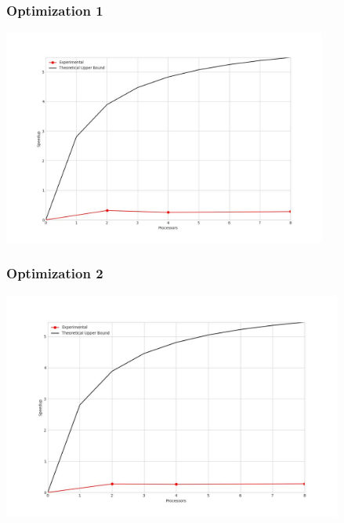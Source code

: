 \subsubsection{Optimization 1}
\begin{center}
    \resizebox{0.95\textwidth}{!}{}
    \includegraphics[width=0.8\textwidth]{../img/speedup-graph_type-fully-connected-12500-O1}
\end{center}

\clearpage
\subsubsection{Optimization 2}
\begin{center}
    \resizebox{0.95\textwidth}{!}{}
    \includegraphics[width=0.84\textwidth]{../img/speedup-graph_type-fully-connected-12500-O2}
\end{center}

